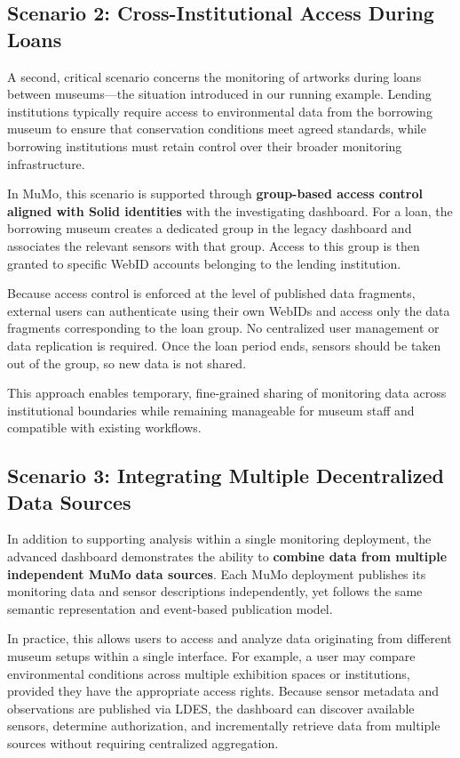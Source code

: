 \documentclass{ceurart}
\begin{document}
\subsection{Scenario 2: Cross-Institutional Access During
Loans}\label{scenario-2-cross-institutional-access-during-loans}

A second, critical scenario concerns the monitoring of artworks during
loans between museums---the situation introduced in our running example.
Lending institutions typically require access to environmental data from
the borrowing museum to ensure that conservation conditions meet agreed
standards, while borrowing institutions must retain control over their
broader monitoring infrastructure.

In MuMo, this scenario is supported through \textbf{group-based access
control aligned with Solid identities} with the investigating dashboard.
For a loan, the borrowing museum creates a dedicated group in the legacy
dashboard and associates the relevant sensors with that group. Access to
this group is then granted to specific WebID accounts belonging to the
lending institution.

Because access control is enforced at the level of published data
fragments, external users can authenticate using their own WebIDs and
access only the data fragments corresponding to the loan group. No
centralized user management or data replication is required. Once the
loan period ends, sensors should be taken out of the group, so new data
is not shared.

This approach enables temporary, fine-grained sharing of monitoring data
across institutional boundaries while remaining manageable for museum
staff and compatible with existing workflows.

\subsection{Scenario 3: Integrating Multiple Decentralized Data
Sources}\label{scenario-3-integrating-multiple-decentralized-data-sources}

In addition to supporting analysis within a single monitoring
deployment, the advanced dashboard demonstrates the ability to
\textbf{combine data from multiple independent MuMo data sources}. Each
MuMo deployment publishes its monitoring data and sensor descriptions
independently, yet follows the same semantic representation and
event-based publication model.

In practice, this allows users to access and analyze data originating
from different museum setups within a single interface. For example, a
user may compare environmental conditions across multiple exhibition
spaces or institutions, provided they have the appropriate access
rights. Because sensor metadata and observations are published via LDES,
the dashboard can discover available sensors, determine authorization,
and incrementally retrieve data from multiple sources without requiring
centralized aggregation.
\end{document}
